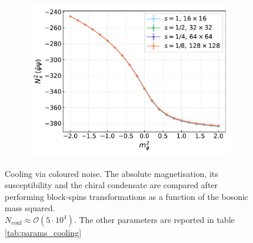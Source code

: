\begin{figure}[hbp]
\begin{subfigure}[b]{0.48\textwidth}
        \includegraphics[width=1.05\textwidth]{figures/cooling/mass_scan/condensate.pdf}
    \end{subfigure}
    \caption[Cooling stochastic quantisation: fields as a function of the bosonic mass squared.]{Cooling via coloured noise. The absolute magnetisation, its susceptibility and the chiral condensate are compared after performing block-spins transformations as a function of the bosonic mass squared. \\ $N_\text{conf} \approx \mathcal{O}(5 \cdot 10^4)$. The other parameters are reported in table \ref{tab:params_cooling}}
    \label{fig:cooling_M_psibarpsi_chi2}
\end{figure}
